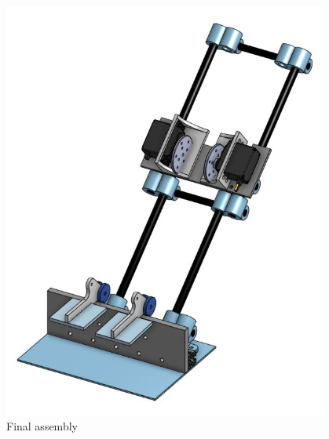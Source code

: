 \begin{figure}[htp]
\centering
\includegraphics[width=0.95\textwidth, angle=0]{Meetings/October/10-30-21/10-30-21_CAD_Figure8 - Nathan Forrer.JPG}
\caption{Final assembly}
\label{fig:103021_7}
\end{figure}


